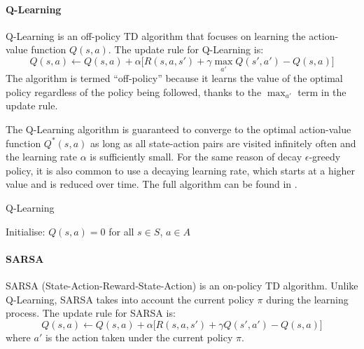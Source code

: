  \paragraph*{Q-Learning}
 Q-Learning is an off-policy TD algorithm that focuses on learning the action-value function \(Q(s, a)\). The update rule for Q-Learning is:
 \begin{equation}
 Q(s, a) \leftarrow Q(s, a) + \alpha \Big[ R(s, a, s') + \gamma \max_{a'} Q(s', a') - Q(s, a) \Big]
 \end{equation}
 The algorithm is termed ``off-policy'' because it learns the value of the optimal policy regardless of the policy being followed, 
  thanks to the \(\max_{a'}\) term in the update rule.
 
The Q-Learning algorithm is guaranteed to converge to the optimal action-value function \(Q^*(s, a)\) as long as all state-action pairs are visited infinitely often and the learning rate \(\alpha\) is sufficiently small.
% 
For the same reason of decay \(\epsilon\)-greedy policy,
  it is also common to use a decaying learning rate, 
  which starts at a higher value and is reduced over time.
The full algorithm can be found in .
\begin{algorithm}
\DontPrintSemicolon
\caption{Q-Learning}\label{alg:q-learning}
Initialise: $Q(s, a) = 0$ for all $s \in S$, $a \in A$\;
\end{algorithm}

 \paragraph*{SARSA}
 SARSA (State-Action-Reward-State-Action) is an on-policy TD algorithm. 
  Unlike Q-Learning, SARSA takes into account the current policy \(\pi\) during the learning process. The update rule for SARSA is:
 \begin{equation}
 Q(s, a) \leftarrow Q(s, a) + \alpha \Big[ R(s, a, s') + \gamma Q(s', a') - Q(s, a) \Big]
 \end{equation}
 where \(a'\) is the action taken under the current policy \(\pi\).
 
